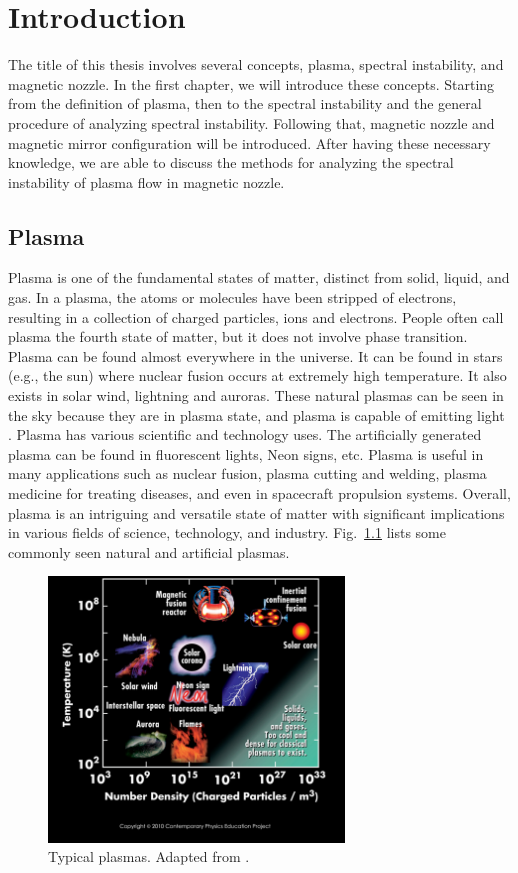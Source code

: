 \chapter{Introduction}
The title of this thesis involves several concepts, plasma, spectral instability, and magnetic nozzle. In the first chapter, we will introduce these concepts. Starting from the definition of plasma, then to the spectral instability and the general procedure of analyzing spectral instability. Following that, magnetic nozzle and magnetic mirror configuration will be introduced. After having these necessary knowledge, we are able to discuss the methods for analyzing the spectral instability of plasma flow in magnetic nozzle.

\section{Plasma}
Plasma is one of the fundamental states of matter, distinct from solid, liquid, and gas. In a plasma, the atoms or molecules have been stripped of electrons, resulting in a collection of charged particles, ions and electrons. People often call plasma the fourth state of matter, but it does not involve phase transition. Plasma can be found almost everywhere in the universe. It can be found in stars (e.g., the sun) where nuclear fusion occurs at extremely high temperature. It also exists in solar wind, lightning and auroras. These natural plasmas can be seen in the sky because they are in plasma state, and plasma is capable of emitting light \cite{chen_introduction_2016}. Plasma has various scientific and technology uses. The artificially generated plasma can be found in fluorescent lights, Neon signs, etc. Plasma is useful in many applications such as nuclear fusion, plasma cutting and welding, plasma medicine for treating diseases, and even in spacecraft propulsion systems. Overall, plasma is an intriguing and versatile state of matter with significant implications in various fields of science, technology, and industry. Fig.~\ref{fig:plasma-properties} lists some commonly seen natural and artificial plasmas.

\begin{figure}[htbp]
	\centering
	\includegraphics[width=0.7\textwidth]{figures/plasma-properties}
	\caption{Typical plasmas. Adapted from \cite{cpep_physics}.}
	\label{fig:plasma-properties}
\end{figure}

